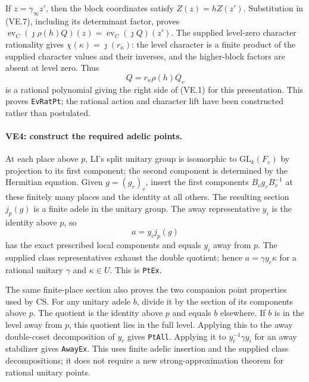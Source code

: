 \documentclass[11pt,a4paper]{article}
\numberwithin{equation}{section}
\theoremstyle{remark}\newtheorem{remark}[theorem]{Remark}
\begin{document}
If $z=\gamma_\infty z'$, then the block coordinates satisfy
$Z(z)=hZ(z')$. Substitution in (VE.7), including its determinant
factor, proves
$\operatorname{ev}_C(\jmath\rho(h)Q)(z)
=\operatorname{ev}_C(\jmath Q)(z')$.
The supplied level-zero character rationality gives
$\chi(\kappa)=\jmath(r_\kappa)$: the level character is a finite
product of the supplied character values and their inverses, and
the higher-block factors are absent at level zero. Thus
\[
 Q=r_\kappa\rho(h)Q_c
                                                        \tag{VE.8}
\]
is a rational polynomial giving the right side of (VE.1) for this
presentation. This proves \texttt{EvRatPt}; the rational action and
character lift have been constructed rather than postulated.

\paragraph{VE4: construct the required adelic points.}
At each place above $p$, LI's split unitary group is isomorphic to
$\mathrm{GL}_k(F_v)$ by projection to its first component; the
second component is determined by the Hermitian equation. Given
$g=(g_v)_v$, insert the first components $B_vg_vB_v^{-1}$ at these
finitely many places and the identity at all others. The resulting
section $j_p(g)$ is a finite adele in the unitary group.
The away representative $y_i$ is the identity above $p$, so
\[
 a=y_i j_p(g)
                                                        \tag{VE.9}
\]
has the exact prescribed local components and equals $y_i$ away
from $p$. The supplied class representatives exhaust the double
quotient; hence $a=\gamma y_c\kappa$ for a rational unitary
$\gamma$ and $\kappa\in U$. This is \texttt{PtEx}.

The same finite-place section also proves the two companion point
properties used by CS. For any unitary adele $b$, divide it by the
section of its components above $p$. The quotient is the identity
above $p$ and equals $b$ elsewhere. If $b$ is in the level away
from $p$, this quotient lies in the full level. Applying this to
the away double-coset decomposition of $y_c$ gives \texttt{PtAll}.
Applying it to $y_i^{-1}\gamma y_i$ for an away stabilizer gives
\texttt{AwayEx}. This uses finite adelic insertion and the supplied
class decompositions; it does not require a new strong-approximation
theorem for rational unitary points.
\end{document}
